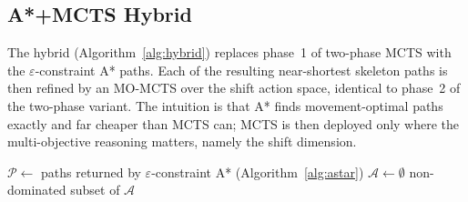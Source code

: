 \subsection{A*+MCTS Hybrid}
\label{sec:hybrid}
The hybrid (Algorithm~\ref{alg:hybrid}) replaces phase~1 of two-phase MCTS with the $\varepsilon$-constraint A* paths. Each of the resulting near-shortest skeleton paths is then refined by an MO-MCTS over the shift action space, identical to phase~2 of the two-phase variant. The intuition is that A* finds movement-optimal paths exactly and far cheaper than MCTS can; MCTS is then deployed only where the multi-objective reasoning matters, namely the shift dimension.

\begin{algorithm}[h]
\SetAlgoLined
{}
$\mathcal{P} \leftarrow$ paths returned by $\varepsilon$-constraint A* (Algorithm~\ref{alg:astar})\;
$\mathcal{A} \leftarrow \emptyset$\;
\Return non-dominated subset of $\mathcal{A}$\;
\caption{A*+MCTS Hybrid}
\label{alg:hybrid}
\end{algorithm}
